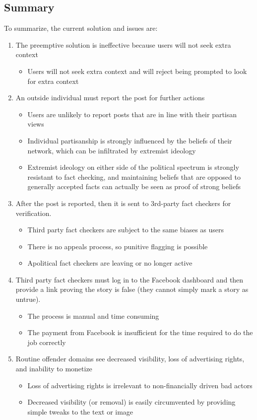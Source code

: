\documentclass[NETN,manuscript]{stjour-new}
\begin{document}
\subsection{Summary}
To summarize, the current solution and issues are:
\renewcommand{\labelenumii}{\Roman{enumii}}
\begin{enumerate}
\item The preemptive solution is ineffective because users will not seek extra context
\begin{itemize}
\item Users will not seek extra context and will reject being prompted to look for extra context
\end{itemize}
\item An outside individual must report the post for further actions
 \begin{itemize}
     \item Users are unlikely to report posts that are in line with their partisan views
     \item Individual partisanship is strongly influenced by the beliefs of their network, which can be infiltrated by extremist ideology
     \item Extremist ideology on either side of the political spectrum is strongly resistant to fact checking, and maintaining beliefs that are opposed to generally accepted facts can actually be seen as proof of strong beliefs
    \end{itemize}
     \item After the post is reported, then it is  sent to 3rd-party fact checkers for verification. 
     \begin{itemize}
         \item Third party fact checkers are subject to the same biases as users
         \item There is no appeals process, so punitive flagging is possible
         \item Apolitical fact checkers are leaving or no longer active
     \end{itemize}
     \item Third party fact checkers must log in to the Facebook dashboard and then provide a link proving the story is false (they cannot simply mark a story as untrue).
     \begin{itemize}
         \item The process is manual and time consuming
         \item The payment from Facebook is insufficient for the time required to do the job correctly
     \end{itemize}
     \item Routine offender domains see decreased visibility, loss of advertising rights, and inability to monetize
     \begin{itemize}
         \item Loss of advertising rights is irrelevant to non-financially driven bad actors
         \item Decreased visibility (or removal) is easily circumvented by providing simple tweaks to the text or image
     \end{itemize}
 \end{enumerate}
\end{document}
